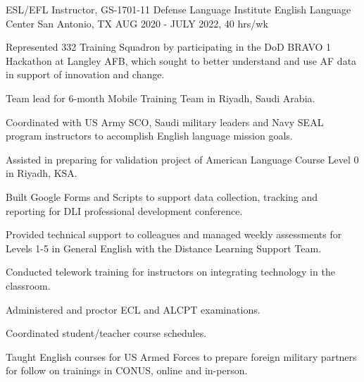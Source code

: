 \begin{cventries}
\cventry
{ESL/EFL Instructor, GS-1701-11} %
{Defense Language Institute English Language Center} %
{San Antonio, TX} %
{AUG 2020 - JULY 2022, 40 hrs/wk} %
{ %
\begin{cvitems}
\item {Represented 332 Training Squadron by participating in the DoD BRAVO 1 Hackathon at Langley AFB, which sought to better understand and use AF data in support of innovation and change.}
\item {Team lead for 6-month Mobile Training Team in Riyadh, Saudi Arabia.}
\item {Coordinated with US Army SCO, Saudi military leaders and Navy SEAL program instructors to accomplish English language mission goals.}
\item {Assisted in preparing for validation project of American Language Course Level 0 in Riyadh, KSA.}
\item {Built Google Forms and Scripts to support data collection, tracking and reporting for DLI professional development conference.}
\item {Provided technical support to colleagues and managed weekly assessments for Levels 1-5 in General English with the Distance Learning Support Team.}
\item {Conducted telework training for instructors on integrating technology in the classroom.}
\item {Administered and proctor ECL and ALCPT examinations.}
\item {Coordinated student/teacher course schedules.}
\item {Taught English courses for US Armed Forces to prepare foreign military partners for follow on trainings in CONUS, online and in-person.}
\end{cvitems}
}


\end{cventries}
